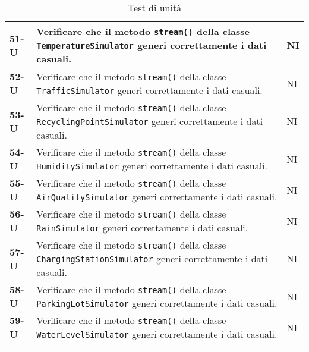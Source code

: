 \begin{longtable}{|>{\raggedright\arraybackslash}m{}|>{\raggedright\arraybackslash}m{}|>{\raggedright\arraybackslash}m{}|}
	\hline
	\textbf{51-U}   & Verificare che il metodo \texttt{stream()} della classe \texttt{TemperatureSimulator} generi correttamente i dati casuali.                                        & NI             \\
	\hline
	\textbf{52-U}   & Verificare che il metodo \texttt{stream()} della classe \texttt{TrafficSimulator} generi correttamente i dati casuali.                                            & NI             \\
	\hline
	\textbf{53-U}   & Verificare che il metodo \texttt{stream()} della classe \texttt{RecyclingPointSimulator} generi correttamente i dati casuali.                                     & NI             \\
	\hline
	\textbf{54-U}   & Verificare che il metodo \texttt{stream()} della classe \texttt{HumiditySimulator} generi correttamente i dati casuali.                                           & NI             \\
	\hline
	\textbf{55-U}   & Verificare che il metodo \texttt{stream()} della classe \texttt{AirQualitySimulator} generi correttamente i dati casuali.                                         & NI             \\
	\hline
	\textbf{56-U}   & Verificare che il metodo \texttt{stream()} della classe \texttt{RainSimulator} generi correttamente i dati casuali.                                               & NI             \\
	\hline
	\textbf{57-U}   & Verificare che il metodo \texttt{stream()} della classe \texttt{ChargingStationSimulator} generi correttamente i dati casuali.                                    & NI             \\
	\hline
	\textbf{58-U}   & Verificare che il metodo \texttt{stream()} della classe \texttt{ParkingLotSimulator} generi correttamente i dati casuali.                                         & NI             \\
	\hline
	\textbf{59-U}   & Verificare che il metodo \texttt{stream()} della classe \texttt{WaterLevelSimulator} generi correttamente i dati casuali.                                         & NI             \\
	\hline
	\caption{Test di unità}
\end{longtable}

